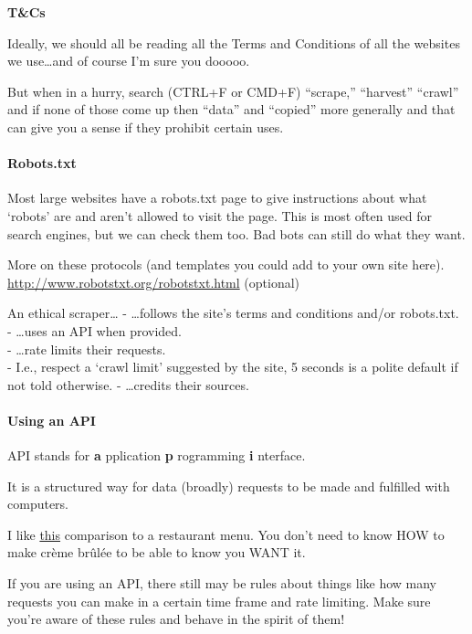 \documentclass[
  openany]{book}
\begin{document}
\textbf{T\&Cs}

Ideally, we should all be reading all the Terms and Conditions of all the websites we use\ldots and of course I'm sure you dooooo.

But when in a hurry, search (CTRL+F or CMD+F) ``scrape,'' ``harvest'' ``crawl'' and if none of those come up then ``data'' and ``copied'' more generally and that can give you a sense if they prohibit certain uses.

\hypertarget{robots.txt}{%
\paragraph{Robots.txt}\label{robots.txt}}

Most large websites have a robots.txt page to give instructions about what `robots' are and aren't allowed to visit the page. This is most often used for search engines, but we can check them too. Bad bots can still do what they want.

More on these protocols (and templates you could add to your own site here).
\url{http://www.robotstxt.org/robotstxt.html} (optional)

An ethical scraper\ldots{}
- \ldots follows the site's terms and conditions and/or robots.txt.\\
- \ldots uses an API when provided.\\
- \ldots rate limits their requests.\\
- I.e., respect a `crawl limit' suggested by the site, 5 seconds is a polite default if not told otherwise.
- \ldots credits their sources.

\hypertarget{using-an-api}{%
\paragraph{Using an API}\label{using-an-api}}

API stands for \textbf{a} pplication \textbf{p} rogramming \textbf{i} nterface.

It is a structured way for data (broadly) requests to be made and fulfilled with computers.

I like \href{https://www.howtogeek.com/343877/what-is-an-api/}{this} comparison to a restaurant menu. You don't need to know HOW to make crème brûlée to be able to know you WANT it.

If you are using an API, there still may be rules about things like how many requests you can make in a certain time frame and rate limiting. Make sure you're aware of these rules and behave in the spirit of them!
\end{document}
